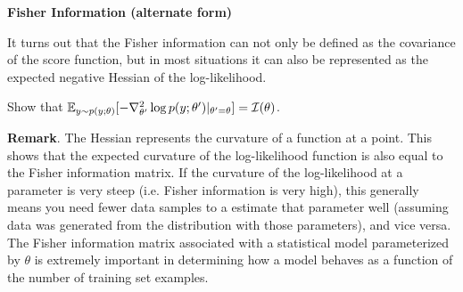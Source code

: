 \item {} \textbf{Fisher Information (alternate form)}

It turns out that the Fisher information can not only be defined as the covariance of the score function,
but in most situations it can also be represented as the expected negative Hessian of the log-likelihood.

Show that $\mathbb{E}_{y\sim p(y;\theta)}[-\nabla^2_{\theta'} \log p(y;\theta')|_{\theta'=\theta}]=\mathcal{I}(\theta)$.

\textbf{Remark}. The Hessian represents the curvature of a function at a point. This shows that the expected curvature of the log-likelihood function is also equal to the Fisher information matrix. If the curvature of the log-likelihood at a parameter is very steep (i.e. Fisher information is very high), this generally means you need fewer data samples to a estimate that parameter well (assuming data was generated from the distribution with those parameters), and vice versa. The Fisher information matrix associated with a statistical model parameterized by $\theta$ is extremely important in determining how a model behaves as a function of the number of training set examples.

